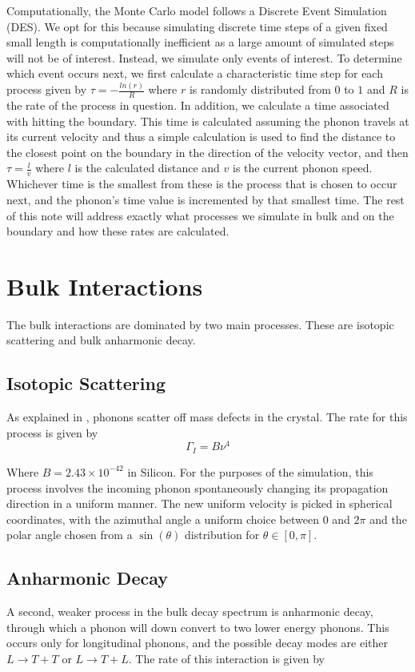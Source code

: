 \documentclass[11pt]{article}
\begin{document}
Computationally, the Monte Carlo model follows a Discrete Event Simulation (DES). We opt for this because simulating discrete time steps of
a given fixed small length is computationally inefficient as a large amount of simulated steps will not be of interest. Instead, we simulate only 
events of interest. To determine which event occurs next, we first calculate a characteristic time step for each process given by 
$\tau = -\frac{ln(r)}{R}$ where $r$ is randomly distributed from $0$ to $1$ and $R$ is the rate of the process in question. In addition, we 
calculate a time associated with hitting the boundary. This time is calculated assuming the phonon travels at its current velocity and thus a simple
calculation is used to find the distance to the closest point on the boundary in the direction of the velocity vector, and then $\tau = \frac{l}{v}$
where $l$ is the calculated distance and $v$ is the current phonon speed. Whichever time is the smallest from these is the process that 
is chosen to occur next, and the  phonon's time value is incremented by that smallest time. The rest of this note will address exactly what processes
we simulate in bulk and on the boundary and how these rates are calculated.

\section*{Bulk Interactions}

The bulk interactions are dominated by two main processes. These are isotopic scattering and bulk anharmonic decay. 

\subsection*{Isotopic Scattering}
As explained in \cite{1}, phonons scatter off mass defects in the crystal. The rate for this process is given by
\begin{equation}
\Gamma_I = B\nu^4\label{eq:2}
\end{equation}

Where $B = 2.43 \times 10^{-42}$ in Silicon. For the purposes of the simulation, this process involves the incoming phonon spontaneously 
changing its propagation direction in a uniform manner. The new uniform velocity is picked in spherical coordinates, with the azimuthal angle a
uniform choice between $0$ and $2\pi$ and the polar angle chosen from a $\sin(\theta)$ distribution for $\theta \in [0, \pi]$.

\subsection*{Anharmonic Decay}
A second, weaker process in the bulk decay spectrum is anharmonic decay, through which a phonon will down convert to two lower energy
phonons. This occurs only for longitudinal phonons, and the possible decay modes are either $L\rightarrow T+T$ or $L\rightarrow T+L$.
The rate of this interaction is given by 
\end{document}
